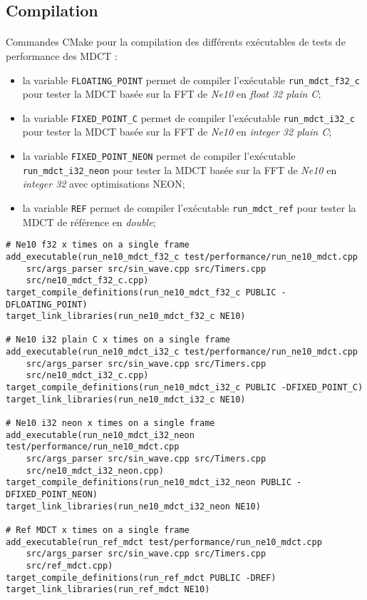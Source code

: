 \documentclass{article}
\begin{document}
\subsection{Compilation}\label{app:perf_mdct_ne10_cmake}
\paragraph{}
Commandes CMake pour la compilation des différents exécutables de tests de performance des MDCT :
\begin{itemize}
    \item la variable \texttt{FLOATING\_POINT} permet de compiler l'exécutable \texttt{run\_mdct\_f32\_c} pour tester la MDCT basée sur la FFT de \emph{Ne10} en \emph{float 32 plain C};
    \item la variable \texttt{FIXED\_POINT\_C} permet de compiler l'exécutable \texttt{run\_mdct\_i32\_c} pour tester la MDCT basée sur la FFT de \emph{Ne10} en \emph{integer 32 plain C};
    \item la variable \texttt{FIXED\_POINT\_NEON} permet de compiler l'exécutable \texttt{run\_mdct\_i32\_neon} pour tester la MDCT basée sur la FFT de \emph{Ne10} en \emph{integer 32} avec optimisations NEON;
    \item la variable \texttt{REF} permet de compiler l'exécutable \texttt{run\_mdct\_ref} pour tester la MDCT de référence en \emph{double};
\end{itemize}
\lstset{language=make}
\begin{lstlisting}
# Ne10 f32 x times on a single frame
add_executable(run_ne10_mdct_f32_c test/performance/run_ne10_mdct.cpp
    src/args_parser src/sin_wave.cpp src/Timers.cpp
    src/ne10_mdct_f32_c.cpp)
target_compile_definitions(run_ne10_mdct_f32_c PUBLIC -DFLOATING_POINT)
target_link_libraries(run_ne10_mdct_f32_c NE10)

# Ne10 i32 plain C x times on a single frame
add_executable(run_ne10_mdct_i32_c test/performance/run_ne10_mdct.cpp
    src/args_parser src/sin_wave.cpp src/Timers.cpp
    src/ne10_mdct_i32_c.cpp)
target_compile_definitions(run_ne10_mdct_i32_c PUBLIC -DFIXED_POINT_C)
target_link_libraries(run_ne10_mdct_i32_c NE10)

# Ne10 i32 neon x times on a single frame
add_executable(run_ne10_mdct_i32_neon test/performance/run_ne10_mdct.cpp
    src/args_parser src/sin_wave.cpp src/Timers.cpp
    src/ne10_mdct_i32_neon.cpp)
target_compile_definitions(run_ne10_mdct_i32_neon PUBLIC -DFIXED_POINT_NEON)
target_link_libraries(run_ne10_mdct_i32_neon NE10)

# Ref MDCT x times on a single frame
add_executable(run_ref_mdct test/performance/run_ne10_mdct.cpp
    src/args_parser src/sin_wave.cpp src/Timers.cpp
    src/ref_mdct.cpp)
target_compile_definitions(run_ref_mdct PUBLIC -DREF)
target_link_libraries(run_ref_mdct NE10)
\end{lstlisting}
\end{document}
